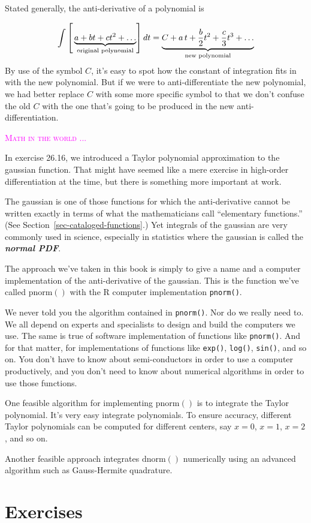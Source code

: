 \documentclass[
  letterpaper,
  DIV=11,
  numbers=noendperiod,
  oneside]{scrreprt}
\newenvironment{intheworld}%
{%
\textcolor{magenta}{\hrulefill}%
  \par\vspace{.3\baselineskip}%
  \textcolor{magenta}{\scshape Math in the world ...}%
  \par\vspace{\baselineskip}%
}%
{\textcolor{magenta}{\hrulefill}}
\newcommand{\pnorm}{\text{pnorm}}
\newcommand{\dnorm}{\text{dnorm}}
\begin{document}
Stated generally, the anti-derivative of a polynomial is

\[{\Large\int} \left[\strut \underbrace{a + b t + ct^2 + \ldots}_\text{original polynomial}\right] dt = \underbrace{C + a\,t + \frac{b}{2} t^2 + \frac{c}{3} t^3 + \ldots}_\text{new polynomial}\]
By use of the symbol \(C\), it's easy to spot how the constant of
integration fits in with the new polynomial. But if we were to
anti-differentiate the new polynomial, we had better replace \(C\) with
some more specific symbol to that we don't confuse the old \(C\) with
the one that's going to be produced in the new anti-differentiation.

\begin{intheworld}
In exercise 26.16, we introduced a Taylor polynomial approximation to
the gaussian function. That might have seemed like a mere exercise in
high-order differentiation at the time, but there is something more
important at work.

The gaussian is one of those functions for which the anti-derivative
cannot be written exactly in terms of what the mathematicians call
``elementary functions.'' (See Section~\ref{sec-cataloged-functions}.)
Yet integrals of the gaussian are very commonly used in science,
especially in statistics where the gaussian is called the
\textbf{\emph{normal PDF}}.

The approach we've taken in this book is simply to give a name and a
computer implementation of the anti-derivative of the gaussian. This is
the function we've called \(\pnorm()\) with the R computer
implementation \texttt{pnorm()}.

We never told you the algorithm contained in \texttt{pnorm()}. Nor do we
really need to. We all depend on experts and specialists to design and
build the computers we use. The same is true of software implementation
of functions like \texttt{pnorm()}. And for that matter, for
implementations of functions like \texttt{exp()}, \texttt{log()},
\texttt{sin()}, and so on. You don't have to know about semi-conductors
in order to use a computer productively, and you don't need to know
about numerical algorithms in order to use those functions.

One feasible algorithm for implementing \(\pnorm()\) is to integrate the
Taylor polynomial. It's very easy integrate polynomials. To ensure
accuracy, different Taylor polynomials can be computed for different
centers, say \(x=0\), \(x=1\), \(x=2\), and so on.

Another feasible approach integrates \(\dnorm()\) numerically using an
advanced algorithm such as Gauss-Hermite quadrature.

\end{intheworld}

\hypertarget{exercises-4}{%
\section{Exercises}\label{exercises-4}}
\end{document}

